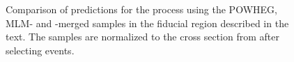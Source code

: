 \begin{figure}[htbp]
  \caption[Comparison of predictions for \QCDWZ production including hadronization effects]
  {Comparison of predictions for the \QCDWZ process using the POWHEG, \MG MLM- and \FxFx-merged samples 
  in the fiducial region described in the text. The samples are normalized to the cross section
  from \MG after selecting \WZjj events.}
 \label{fig:qcdwzHadronization}
\end{figure}
